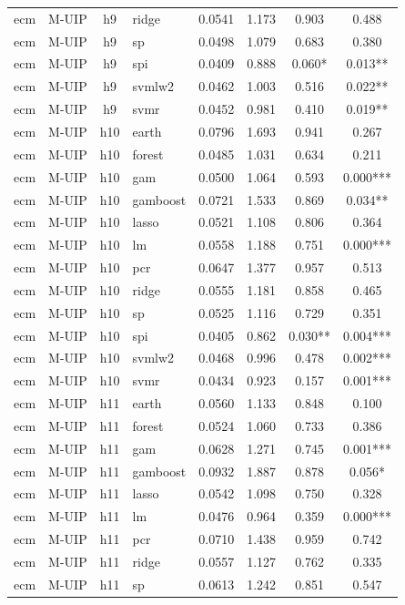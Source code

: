\begin{ThreePartTable}
\begin{longtable}[t]{llclcccc}
ecm & M-UIP & h9 & ridge & 0.0541 & 1.173 & 0.903 & 0.488\\
ecm & M-UIP & h9 & sp & 0.0498 & 1.079 & 0.683 & 0.380\\
ecm & M-UIP & h9 & spi & 0.0409 & 0.888 & 0.060* & 0.013**\\
ecm & M-UIP & h9 & svmlw2 & 0.0462 & 1.003 & 0.516 & 0.022**\\
ecm & M-UIP & h9 & svmr & 0.0452 & 0.981 & 0.410 & 0.019**\\
\addlinespace
ecm & M-UIP & h10 & earth & 0.0796 & 1.693 & 0.941 & 0.267\\
ecm & M-UIP & h10 & forest & 0.0485 & 1.031 & 0.634 & 0.211\\
ecm & M-UIP & h10 & gam & 0.0500 & 1.064 & 0.593 & 0.000***\\
ecm & M-UIP & h10 & gamboost & 0.0721 & 1.533 & 0.869 & 0.034**\\
ecm & M-UIP & h10 & lasso & 0.0521 & 1.108 & 0.806 & 0.364\\
ecm & M-UIP & h10 & lm & 0.0558 & 1.188 & 0.751 & 0.000***\\
ecm & M-UIP & h10 & pcr & 0.0647 & 1.377 & 0.957 & 0.513\\
ecm & M-UIP & h10 & ridge & 0.0555 & 1.181 & 0.858 & 0.465\\
ecm & M-UIP & h10 & sp & 0.0525 & 1.116 & 0.729 & 0.351\\
ecm & M-UIP & h10 & spi & 0.0405 & 0.862 & 0.030** & 0.004***\\
ecm & M-UIP & h10 & svmlw2 & 0.0468 & 0.996 & 0.478 & 0.002***\\
ecm & M-UIP & h10 & svmr & 0.0434 & 0.923 & 0.157 & 0.001***\\
\addlinespace
ecm & M-UIP & h11 & earth & 0.0560 & 1.133 & 0.848 & 0.100\\
ecm & M-UIP & h11 & forest & 0.0524 & 1.060 & 0.733 & 0.386\\
ecm & M-UIP & h11 & gam & 0.0628 & 1.271 & 0.745 & 0.001***\\
ecm & M-UIP & h11 & gamboost & 0.0932 & 1.887 & 0.878 & 0.056*\\
ecm & M-UIP & h11 & lasso & 0.0542 & 1.098 & 0.750 & 0.328\\
ecm & M-UIP & h11 & lm & 0.0476 & 0.964 & 0.359 & 0.000***\\
ecm & M-UIP & h11 & pcr & 0.0710 & 1.438 & 0.959 & 0.742\\
ecm & M-UIP & h11 & ridge & 0.0557 & 1.127 & 0.762 & 0.335\\
ecm & M-UIP & h11 & sp & 0.0613 & 1.242 & 0.851 & 0.547\\

\end{longtable}
\end{ThreePartTable}
